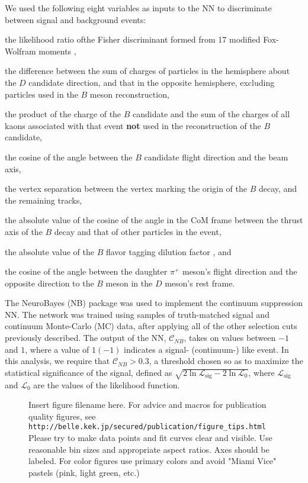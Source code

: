 \documentclass[aps,prl,twocolumn,superscriptaddress,showpacs,preprintnumbers,amsmath,amssymb]{revtex4}
\begin{document}
We used the following eight variables as inputs to the NN to discriminate between signal and background events: 
\begin {enumerate*} [label=\itshape\arabic*\upshape)]
\item the likelihood ratio ofthe Fisher discriminant formed from 17 modified Fox-Wolfram moments \cite{Wolfram}, \item the difference between the sum of charges of particles in the hemisphere about the $D$ candidate direction, and that in the opposite hemisphere, excluding particles used in the $B$ meson reconstruction, \item the product of the charge of the $B$ candidate and the sum of the charges of all kaons associated with that event \textbf{not} used in the reconstruction of the $B$ candidate, \item the cosine of the angle between the $B$ candidate flight direction and the beam axis, \item the vertex separation between the vertex marking the origin of the $B$ decay, and the remaining tracks, \item the absolute value of the cosine of the angle in the CoM frame between the thrust axis of the $B$ decay and that of other particles in the event, \item the absolute value of the $B$ flavor tagging dilution factor \cite{Bdilution}, and \item the cosine of the angle between the daughter $\pi^+$ meson's flight direction and the opposite direction to the $B$ meson in the $D$ meson's rest frame.
\end {enumerate*}

The NeuroBayes (NB) package \cite{Feindt} was used to implement the continuum suppression NN. The network was trained using samples of truth-matched signal and continuum Monte-Carlo (MC) data, after applying all of the other selection cuts previously described. The output of the NN, $\mathcal{C}_{NB}$, takes on values between $-1$ and $1$, where a value of $1 (-1)$ indicates a signal- (continuum-) like event. In this analysis, we require that $\mathcal{C}_{NB} > 0.3$, a threshold chosen so as to maximize the statistical significance of the signal, defined as $\sqrt{2 \ln \mathcal{L}_{\mathrm{sig}} - 2 \ln \mathcal{L}_{\mathrm{0}}}$, where $\mathcal{L}_{\mathrm{sig}}$ and $\mathcal{L}_{\mathrm{0}}$ are the values of the likelihood function. 



\begin{figure}[htb]
\caption{Insert figure filename here.
 For advice and macros for publication quality figures, see\\
{\tt http://belle.kek.jp/secured/publication/figure\_tips.html}
Please try to make data points and fit
curves clear and visible. Use reasonable bin sizes and appropriate
aspect ratios. Axes should be labeled. For color figures
use primary colors and avoid "Miami Vice" pastels (pink, light green, etc.)
}
\label{xm}
\end{figure}
\end{document}
